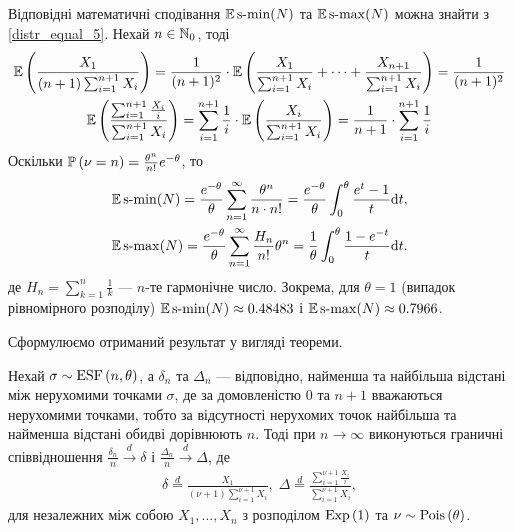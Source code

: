 Відповідні математичні сподівання $\E\smin(N)$ та $\E\smax(N)$ можна знайти з \eqref{distr_equal_5}. 
Нехай $n \in \N_0$, тоді
\begin{gather*}
    \E\left(
        \frac{X_1}{(n+1)\sum_{i=1}^{n+1} X_i}
    \right) = \frac{1}{(n+1)^2}\cdot \E \left(
        \frac{X_1}{\sum_{i=1}^{n+1} X_i} + \dots + \frac{X_{n+1}}{\sum_{i=1}^{n+1} X_i}
    \right) = \frac{1}{(n+1)^2} \\
    \E\left(
        \frac{\sum_{i=1}^{n+1} \frac{X_i}{i}}{\sum_{i=1}^{n+1} X_i}
    \right) = 
    \sum_{i=1}^{n+1} \frac{1}{i} \cdot \E\left(\frac{X_i}{\sum_{i=1}^{n+1} X_i}\right) = 
    \frac{1}{n+1} \cdot \sum_{i=1}^{n+1} \frac{1}{i}
\end{gather*}
Оскільки $\P{\nu = n} = \frac{\theta^n}{n!}e^{-\theta}$, то
\begin{gather*}
    \E\smin(N) = \frac{e^{-\theta}}{\theta}\sum_{n=1}^{\infty} \frac{\theta^n}{n\cdot n!} = 
    \frac{e^{-\theta}}{\theta}\int_0^\theta \frac{e^t-1}{t}\d t, \\
    \E\smax(N) = \frac{e^{-\theta}}{\theta}\sum_{n=1}^{\infty} \frac{H_n}{n!} \theta^n = 
    \frac{1}{\theta} \int_0^{\theta} \frac{1-e^{-t}}{t}\d t.
\end{gather*}
де $H_n = \sum_{k=1}^n \frac{1}{k}$ --- $n$-те гармонічне число.
Зокрема, для $\theta = 1$ (випадок рівномірного розподілу) 
$\E\smin(N) \approx 0.48483$ і $\E\smax(N) \approx 0.7966$.

Сформулюємо отриманий результат у вигляді теореми.
\begin{theorem}
    Нехай $\sigma \sim \ESF{n, \theta}$, а $\delta_n$ та $\Delta_n$ ---
    відповідно, найменша та найбільша відстані між нерухомими точками $\sigma$,
    де за домовленістю $0$ та $n+1$ вважаються нерухомими точками, тобто
    за відсутності нерухомих точок найбільша та найменша відстані обидві дорівнюють $n$.
    Тоді при $n\to\infty$ виконуються граничні
    співвідношення
    $\frac{\delta_n}{n} \overset{d}{\longrightarrow} \delta$ і 
    $\frac{\Delta_n}{n} \overset{d}{\longrightarrow} \Delta$, де
    \begin{gather}
        \delta \overset{d}{=}
        \frac{X_1}{(\nu+1)\sum_{i=1}^{\nu+1} X_i}, \;
        \Delta \overset{d}{=} 
        \frac{\sum_{i=1}^{\nu+1} \frac{X_i}{i}}{\sum_{i=1}^{\nu+1} X_i},
    \end{gather}
    для незалежних між собою $X_1, ... ,X_n$
    з розподілом $\Exp{1}$ та $\nu \sim \Poiss{\theta}$.
\end{theorem}